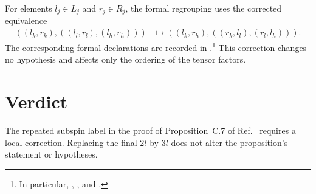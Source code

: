 \documentclass{article}
\begin{document}
For elements $l_j\in L_j$ and $r_j\in R_j$, the formal regrouping uses the
corrected equivalence
\begin{align}
    ((l_k,r_k),((l_l,r_l),(l_h,r_h)))
        &\longmapsto
        ((l_k,r_h),((r_k,l_l),(r_l,l_h))).
    \label{eq:cpgsv17_mpdo_s0_trace_subspin_typo_corrected_regrouping}
\end{align}
The corresponding formal declarations are recorded in
.\footnote{In particular,
,
, and
.}
This correction changes no hypothesis and affects only the ordering of the
tensor factors.

\section{Verdict}

The repeated subspin label in the proof of Proposition~C.7 of
Ref.~\cite{Cirac2016MPDO_arXiv} requires a local correction. Replacing the
final $2l$ by $3l$ does not alter the proposition's statement or hypotheses.



\end{document}

